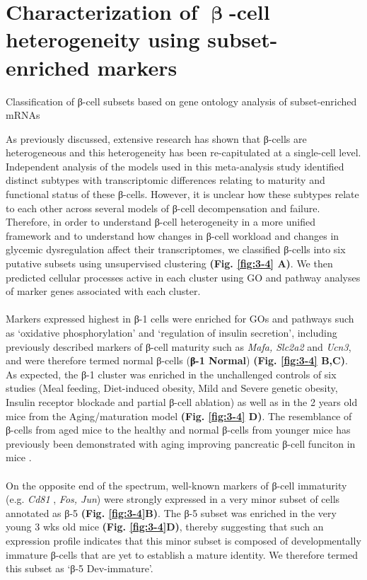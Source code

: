 \clearpage

\section{Characterization of \( \mathbf{\upbeta} \)-cell heterogeneity using subset-\\enriched markers}
Classification of β-cell subsets based on
gene ontology analysis of subset-enriched mRNAs

\label{sec:chp3_betaclustering}
As previously discussed, extensive research has shown that β-cells are heterogeneous and this heterogeneity has been re-capitulated at a single-cell level. Independent analysis of the models used in this meta-analysis study identified distinct subtypes with transcriptomic differences relating to maturity and functional status of these β-cells. However, it is unclear how these subtypes relate to each other across several models of β-cell decompensation and failure. Therefore, in order to understand β-cell heterogeneity in a more unified framework and to understand how changes in β-cell workload and changes in glycemic dysregulation affect their transcriptomes, we classified β-cells into six putative subsets using unsupervised clustering \textbf{(Fig. \ref{fig:3-4} A)}. We then predicted cellular processes active in each cluster using GO and pathway analyses of marker genes associated with each cluster.\\\\
Markers expressed highest in β-1 cells were enriched for GOs and pathways such as `oxidative phosphorylation' and `regulation of insulin secretion', including previously described markers of β-cell maturity such as \textit{Mafa, Slc2a2}  and \textit{Ucn3}, and were therefore termed normal β-cells (\textbf{β-1 Normal}) \textbf{(Fig. \ref{fig:3-4} B,C)}. As expected, the β-1 cluster was enriched in the unchallenged controls of six studies (Meal feeding, Diet-induced obesity, Mild and Severe genetic obesity, Insulin receptor blockade and partial β-cell ablation) as well as in the 2 years old mice from the Aging/maturation model \textbf{(Fig. \ref{fig:3-4} D)}. The resemblance of β-cells from aged mice to the healthy and normal β-cells from younger mice has previously been demonstrated with aging improving pancreatic β-cell funciton in mice \textbf{\cite{xin_single-cell_2016}}. \\\\
On the opposite end of the spectrum, well-known markers of β-cell immaturity (e.g. \textit{Cd81} \textbf{\cite{salinno_cd81_2021}}, \textit{Fos, Jun})  were strongly expressed in a very minor subset of cells annotated as β-5 \textbf{(Fig. \ref{fig:3-4}B)}. The β-5 subset was enriched in the very young 3 wks old mice  \textbf{(Fig. \ref{fig:3-4}D)}, thereby suggesting that such an expression profile indicates that this minor subset is composed of developmentally immature β-cells that are yet to establish a mature identity. We therefore termed this subset as `β-5 Dev-immature'.
\clearpage

